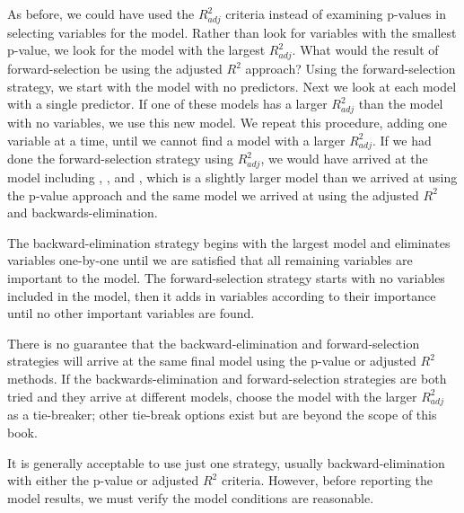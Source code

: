 \begin{example}{As before, we could have used the $R_{adj}^2$ criteria instead of examining p-values in selecting variables for the model. Rather than look for variables with the smallest p-value, we look for the model with the largest $R_{adj}^2$. What would the result of forward-selection be using the adjusted $R^2$ approach?}
Using the forward-selection strategy, we start with the model with no predictors. Next we look at each model with a single predictor. If one of these models has a larger $R_{adj}^2$ than the model with no variables, we use this new model. We repeat this procedure, adding one variable at a time, until we cannot find a model with a larger $R_{adj}^2$. If we had done the forward-selection strategy using $R_{adj}^2$, we would have arrived at the model including , , and , which is a slightly larger model than we arrived at using the p-value approach and the same model we arrived at using the adjusted $R^2$ and backwards-elimination.
\end{example}

\begin{termBox}{
The backward-elimination strategy begins with the largest model and eliminates variables one-by-one until we are satisfied that all remaining variables are important to the model. The forward-selection strategy starts with no variables included in the model, then it adds in variables according to their importance until no other important variables are found.}
\end{termBox}

There is no guarantee that the backward-elimination and forward-selection strategies will arrive at the same final model using the p-value or adjusted $R^2$ methods. If the backwards-elimination and forward-selection strategies are both tried and they arrive at different models, choose the model with the larger $R_{adj}^2$ as a tie-breaker; other tie-break options exist but are beyond the scope of this book.

It is generally acceptable to use just one strategy, usually backward-elimination with either the p-value or adjusted $R^2$ criteria. However, before reporting the model results, we must verify the model conditions are reasonable.



